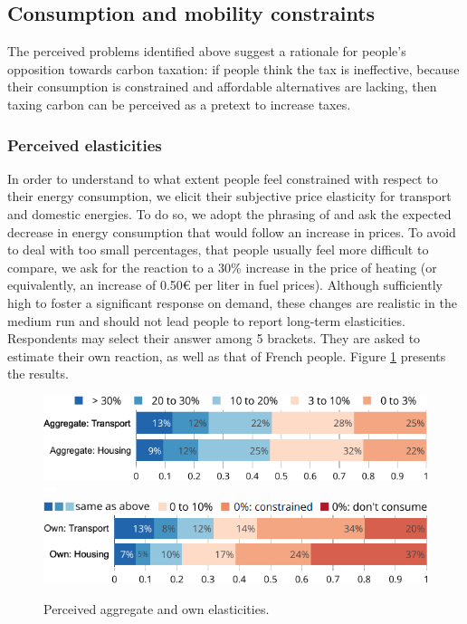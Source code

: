 \documentclass[english,5p,authoryear]{elsarticle}
\begin{document}

    \subsection{Consumption and mobility constraints}

The perceived problems identified above suggest a rationale for people's opposition towards carbon taxation: if people think the tax is ineffective, because their consumption is constrained and affordable alternatives are lacking, then taxing carbon can be perceived as a pretext to increase taxes. %

    \subsubsection{Perceived elasticities}

In order to understand to what extent people feel constrained with respect to their energy consumption, we elicit their subjective price elasticity for transport and domestic energies. To do so, we adopt the phrasing of \citet{baranzini_effectiveness_2017} and ask the expected decrease in energy consumption that would follow an increase in prices. To avoid to deal with too small percentages, that people usually feel more difficult to compare, we ask for the reaction to a 30\% increase in the price of heating (or equivalently, an increase of 0.50\euro{} per liter in fuel prices). Although sufficiently high to foster a significant response on demand, these changes are realistic in the medium run and should not lead people to report long-term elasticities. Respondents may select their answer among 5 brackets. They are asked to estimate their own reaction, as well as that of French people. Figure \ref{fig:elasticities_agg} presents the results.

\begin{figure}[t]
\centering
\includegraphics[width=\columnwidth]{Images/elasticities_agg_valb.png}
\includegraphics[height=0.3cm]{Images/blank.png}
\includegraphics[width=\columnwidth]{Images/elasticities_perso_valbuena.png}
\caption{Perceived aggregate and own elasticities.}
\label{fig:elasticities_agg}
\end{figure}
\end{document}
